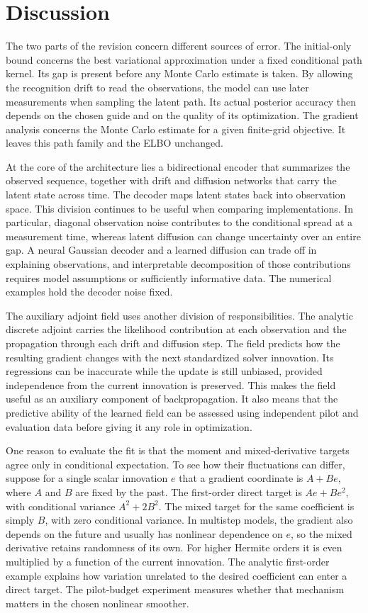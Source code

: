 \documentclass[12pt]{article}
\begin{document}
\section*{Discussion}

The two parts of the revision concern different sources of error. The initial-only bound concerns the best variational approximation under a fixed conditional path kernel. Its gap is present before any Monte Carlo estimate is taken. By allowing the recognition drift to read the observations, the model can use later measurements when sampling the latent path. Its actual posterior accuracy then depends on the chosen guide and on the quality of its optimization. The gradient analysis concerns the Monte Carlo estimate for a given finite-grid objective. It leaves this path family and the ELBO unchanged.

At the core of the architecture lies a bidirectional encoder that summarizes the observed sequence, together with drift and diffusion networks that carry the latent state across time. The decoder maps latent states back into observation space. This division continues to be useful when comparing implementations. In particular, diagonal observation noise contributes to the conditional spread at a measurement time, whereas latent diffusion can change uncertainty over an entire gap. A neural Gaussian decoder and a learned diffusion can trade off in explaining observations, and interpretable decomposition of those contributions requires model assumptions or sufficiently informative data. The numerical examples hold the decoder noise fixed.

The auxiliary adjoint field uses another division of responsibilities. The analytic discrete adjoint carries the likelihood contribution at each observation and the propagation through each drift and diffusion step. The field predicts how the resulting gradient changes with the next standardized solver innovation. Its regressions can be inaccurate while the update is still unbiased, provided independence from the current innovation is preserved. This makes the field useful as an auxiliary component of backpropagation. It also means that the predictive ability of the learned field can be assessed using independent pilot and evaluation data before giving it any role in optimization.

One reason to evaluate the fit is that the moment and mixed-derivative targets agree only in conditional expectation. To see how their fluctuations can differ, suppose for a single scalar innovation \(e\) that a gradient coordinate is \(A+B e\), where \(A\) and \(B\) are fixed by the past. The first-order direct target is \(A e+B e^2\), with conditional variance \(A^2+2B^2\). The mixed target for the same coefficient is simply \(B\), with zero conditional variance. In multistep models, the gradient also depends on the future and usually has nonlinear dependence on \(e\), so the mixed derivative retains randomness of its own. For higher Hermite orders it is even multiplied by a function of the current innovation. The analytic first-order example explains how variation unrelated to the desired coefficient can enter a direct target. The pilot-budget experiment measures whether that mechanism matters in the chosen nonlinear smoother.
\end{document}
